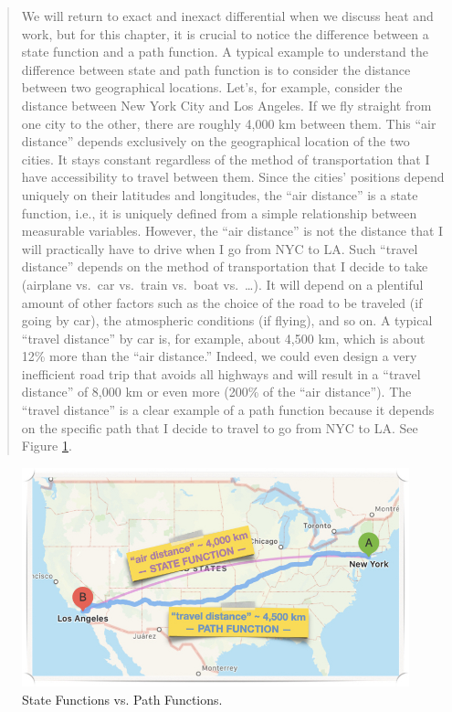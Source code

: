 \documentclass[
  9pt,
]{extbook}
\theoremstyle{definition}
\theoremstyle{definition}
\theoremstyle{definition}
\theoremstyle{definition}
\theoremstyle{remark}
\begin{document}
\begin{quote}
We will return to exact and inexact differential when we discuss heat and work, but for this chapter, it is crucial to notice the difference between a state function and a path function. A typical example to understand the difference between state and path function is to consider the distance between two geographical locations. Let's, for example, consider the distance between New York City and Los Angeles. If we fly straight from one city to the other, there are roughly 4,000 km between them. This ``air distance'' depends exclusively on the geographical location of the two cities. It stays constant regardless of the method of transportation that I have accessibility to travel between them. Since the cities' positions depend uniquely on their latitudes and longitudes, the ``air distance'' is a state function, i.e., it is uniquely defined from a simple relationship between measurable variables. However, the ``air distance'' is not the distance that I will practically have to drive when I go from NYC to LA. Such ``travel distance'' depends on the method of transportation that I decide to take (airplane vs.~car vs.~train vs.~boat vs.~\ldots). It will depend on a plentiful amount of other factors such as the choice of the road to be traveled (if going by car), the atmospheric conditions (if flying), and so on. A typical ``travel distance'' by car is, for example, about 4,500 km, which is about 12\% more than the ``air distance.'' Indeed, we could even design a very inefficient road trip that avoids all highways and will result in a ``travel distance'' of 8,000 km or even more (200\% of the ``air distance''). The ``travel distance'' is a clear example of a path function because it depends on the specific path that I decide to travel to go from NYC to LA. See Figure \ref{fig:Fig2c1}.
\end{quote}

\begin{figure}

{\centering \includegraphics[width=0.6\linewidth]{./img/OEP_Figures.002} 

}

\caption{State Functions vs. Path Functions.}\label{fig:Fig2c1}
\end{figure}
\end{document}
